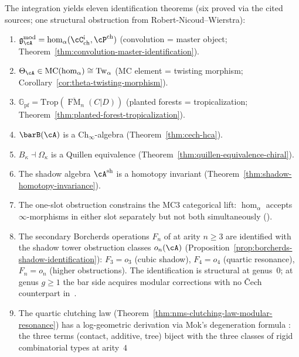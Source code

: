 \begin{remark}
\label{rem:three-pillar-identifications}
The integration yields eleven identification theorems (six proved via
the cited sources; one structural obstruction from
Robert-Nicoud--Wierstra):
\begin{enumerate}[label=\textup{(\arabic*)}]
\item $\mathfrak{g}_\cA^{\mathrm{mod}} =
  \operatorname{hom}_\alpha(\cC^{\textup{!`}}_{\mathrm{ch}},
  \cP^{\mathrm{ch}})$ (convolution = master object;
  Theorem~\ref{thm:convolution-master-identification}).
\item $\Theta_\cA \in \mathrm{MC}(\operatorname{hom}_\alpha)
  \cong \mathrm{Tw}_\alpha$ (MC element = twisting morphism;
  Corollary~\ref{cor:theta-twisting-morphism}).
\item $\mathbb{G}_{\mathrm{pf}} =
  \mathrm{Trop}(\overline{\operatorname{FM}}_n(C|D))$
  (planted forests = tropicalization;
  Theorem~\ref{thm:planted-forest-tropicalization}).
\item $\barB(\cA)$ is a $\mathrm{Ch}_\infty$-algebra
  (Theorem~\ref{thm:cech-hca}).
\item $B_\kappa \dashv \Omega_\kappa$ is a Quillen equivalence
  (Theorem~\ref{thm:quillen-equivalence-chiral}).
\item The shadow algebra $\cA^{\mathrm{sh}}$ is a homotopy invariant
  (Theorem~\ref{thm:shadow-homotopy-invariance}).
\item The one-slot obstruction constrains the MC3 categorical lift:
  $\operatorname{hom}_\alpha$ accepts $\infty$-morphisms in either slot
  separately but not both simultaneously
  (\cite[Theorem~6.6]{RNW19}).
\item The secondary Borcherds operations $F_n$ of \cite{MS24} at
  arity $n \geq 3$ are identified with the shadow tower obstruction
  classes $o_n(\cA)$
  (Proposition~\ref{prop:borcherds-shadow-identification}):
  $F_3 = o_3$ (cubic shadow), $F_4 = o_4$ (quartic resonance),
  $F_n = o_n$ (higher obstructions).  The identification is
  structural at genus~$0$; at genus $g \geq 1$ the bar side
  acquires modular corrections with no \v{C}ech counterpart
  in~\cite{MS24}.
\item The quartic clutching law
  (Theorem~\ref{thm:nms-clutching-law-modular-resonance}) has a
  log-geometric derivation via Mok's degeneration formula
  \cite[Corollary~5.3.4]{Mok25}: the three terms (contact,
  additive, tree) biject with the three classes of rigid
  combinatorial types at arity~$4$

\end{enumerate}
\end{remark}
